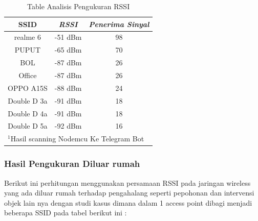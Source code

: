 \documentclass[conference]{IEEEtran}
\begin{document}
    \begin{table}[htbp]
    \caption{Table Analisis Pengukuran RSSI}
    \begin{center}
    \begin{tabular}{|c|c|c|}
        \hline
    \textbf{SSID}&\textbf{\textit{RSSI}}& \textbf{\textit{Penerima Sinyal}} \\
    \hline
    realme 6 & -51 dBm & 98  \\
    \hline
    PUPUT & -65 dBm & 70  \\
    \hline
    BOL & -87 dBm & 26   \\
    \hline
    Office & -87 dBm & 26  \\
    \hline
    OPPO A15S & -88 dBm & 24  \\
    \hline
    Double D 3a & -91 dBm & 18  \\
    \hline
    Double D 4a & -91 dBm & 18  \\
    \hline
    Double D 5a & -92 dBm & 16  \\
    \hline
    \multicolumn{3}{l}{$^{\mathrm{1}}$Hasil scanning Nodemcu Ke Telegram Bot}
    \end{tabular}
    \label{tab1}
    \end{center}
    \end{table}

    \subsubsection{Hasil Pengukuran Diluar rumah}
    Berikut ini perhitungan menggunakan persamaan RSSI 
pada jaringan wireless yang ada diluar rumah
 terhadap pengahalang seperti pepohonan dan intervensi objek lain nya dengan studi kasus dimana dalam 1 access
 point dibagi menjadi beberapa SSID pada tabel berikut ini : 
\end{document}
